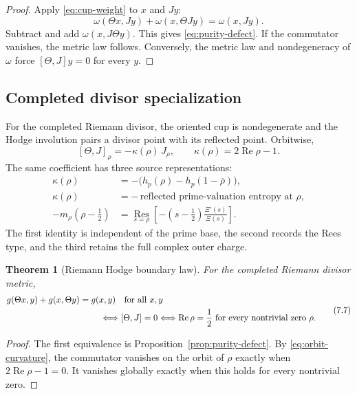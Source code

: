 \documentclass[11pt]{article}
\newtheorem{theorem}{Theorem}[section]
\theoremstyle{definition}
\theoremstyle{remark}
\newcommand{\Rea}{\operatorname{Re}}
\begin{document}
\begin{proof}
Apply \eqref{eq:cup-weight} to \(x\) and \(Jy\):
\[
 \omega(\Theta x,Jy)+\omega(x,\Theta Jy)=\omega(x,Jy).
\]
Subtract and add \(\omega(x,J\Theta y)\).  This gives
\eqref{eq:purity-defect}.  If the commutator vanishes, the metric law
follows.  Conversely, the metric law and nondegeneracy of \(\omega\) force
\([\Theta,J]y=0\) for every \(y\).
\end{proof}

\subsection{Completed divisor specialization}

For the completed Riemann divisor, the oriented cup is nondegenerate and
the Hodge involution pairs a divisor point with its reflected point.
Orbitwise,
\[
 [\Theta,J]_{\rho}
   =-\kappa(\rho)\,J_{\rho},\qquad
 \kappa(\rho)=2\Rea\rho-1.
\tag{7.5}\label{eq:orbit-curvature}
\]
The same coefficient has three source representations:
\[
\begin{aligned}
\kappa(\rho)
 &= -\bigl(h_p(\rho)-h_p(1-\overline\rho)\bigr),\\
\kappa(\rho)
 &= -\,\text{reflected prime-valuation entropy at }\rho,\\
-m_\rho(\rho-\tfrac12)
 &=\operatorname*{Res}_{s=\rho}
     \left[-(s-\tfrac12)\frac{\Xi'(s)}{\Xi(s)}\right].
\end{aligned}
\tag{7.6}\label{eq:charge-representations}
\]
The first identity is independent of the prime base, the second records
the Rees type, and the third retains the full complex outer charge.

\begin{theorem}[Riemann Hodge boundary law]
\label{thm:riemann-hodge}
For the completed Riemann divisor metric,
\[
 \begin{aligned}
 &g(\Theta x,y)+g(x,\Theta y)=g(x,y)
      \quad\text{for all }x,y\\
 &\hspace{38mm}\Longleftrightarrow
      [\Theta,J]=0
      \Longleftrightarrow
      \Rea\rho=\frac12
      \text{ for every nontrivial zero }\rho.
 \end{aligned}
\tag{7.7}\label{eq:rh-hodge}
\]
\end{theorem}

\begin{proof}
The first equivalence is
Proposition~\ref{prop:purity-defect}.  By
\eqref{eq:orbit-curvature}, the commutator vanishes on the orbit of
\(\rho\) exactly when \(2\Rea\rho-1=0\).  It vanishes globally exactly
when this holds for every nontrivial zero.
\end{proof}
\end{document}
